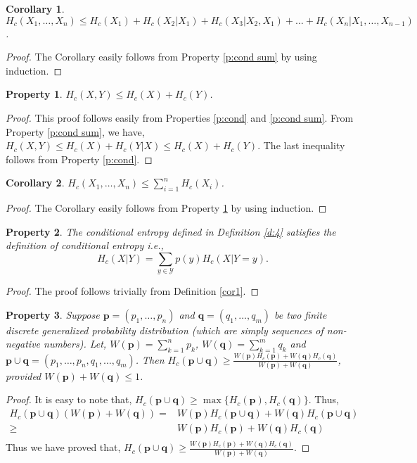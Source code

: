 \documentclass{article}
\newcommand{\bp}{\boldsymbol{p}}
\newcommand{\bq}{\boldsymbol{q}}
\newtheorem{cor}{Corollary}
\newtheorem{prop}{Property}
\begin{document}
\begin{cor}
$H_c(X_1,\dots, X_n) \leq H_c(X_1)+H_c(X_2|X_1)+H_c(X_3|X_2,X_1)+\dots+H_c(X_n|X_1,\dots,X_{n-1})$.
\end{cor}

\begin{proof}
The Corollary easily follows from Property \ref{p:cond sum} by using induction.
\end{proof}
\begin{prop}
\label{p:sum}
$H_c(X,Y) \leq H_c(X)+H_c(Y)$.
\end{prop}

\begin{proof}
This proof follows easily from Properties \ref{p:cond} and \ref{p:cond sum}. From Property \ref{p:cond sum}, we have, $H_c(X,Y) \leq H_c(X) + H_c(Y|X) \leq H_c(X) + H_c(Y)$. The last inequality follows from Property \ref{p:cond}.
\end{proof}

\begin{cor}
$H_c(X_1,\dots, X_n) \leq \sum_{i=1}^n H_c(X_i)$.
\end{cor}
\begin{proof}
The Corollary easily follows from Property \ref{p:sum} by using induction.
\end{proof}

\begin{prop}
The conditional entropy defined in Definition \ref{d:4} satisfies the definition of conditional entropy i.e., $$H_c(X|Y)=\sum_{y\in \mathcal{Y}}p(y)H_c(X|Y=y).$$
\end{prop}
\begin{proof}
The proof follows trivially from Definition \ref{cor1}.
\end{proof}

\begin{prop}
Suppose $\bp=(p_1, \dots, p_n)$ and $\bq=(q_1,\dots,q_m)$ be two finite discrete generalized probability distribution (which are simply sequences of non-negative numbers). Let, $W(\bp)=\sum_{k=1}^n p_k$, $W(\bq)=\sum_{k=1}^m q_k$ and $\bp \cup \bq =(p_1, \dots, p_n,q_1,\dots,q_m)$. Then $H_c(\bp \cup \bq) \geq \frac{W(\bp)H_c(\bp)+W(\bq)H_c(\bq)}{W(\bp)+W(\bq)}$, provided $W(\bp)+W(\bq)\leq 1$.
\end{prop}
\begin{proof}
It is easy to note that, $H_c(\bp \cup \bq) \geq \max\{H_c(\bp),H_c(\bq)\}$. Thus,
\begin{align*}
     H_c(\bp \cup \bq)\left(W(\bp)+W(\bq)\right) = & W(\bp)H_c(\bp \cup \bq)+W(\bq)H_c(\bp \cup \bq)\\
    \geq & W(\bp)H_c(\bp)+W(\bq)H_c(\bq)\\
\end{align*}
Thus we have proved that, $H_c(\bp \cup \bq) \geq \frac{W(\bp)H_c(\bp)+W(\bq)H_c(\bq)}{W(\bp)+W(\bq)}$.

\end{proof}
\end{document}
